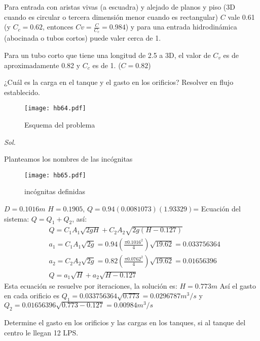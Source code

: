     Para entrada con aristas vivas (a escuadra) y alejado de planos y piso (3D cuando es circular o tercera dimensión menor cuando es rectangular) $C$ vale 0.61 (y $C_c=0.62$, entonces $Cv=\frac{C}{C_c}=0.984$) y para una entrada hidrodinámica (abocinada o tubos cortos) puede valer cerca de 1.
    
    Para un tubo corto que tiene una longitud de 2.5 a 3D, el valor de $C_v$ es de aproximadamente 0.82 y $C_c$ es de 1. ($C=0.82$)
    
    \begin{problem}
        ¿Cuál es la carga en el tanque y el gasto en los orificios? Resolver en flujo establecido.
    \end{problem}
    \begin{figure}[h!]
    \centering
      \texttt{[image: hb64.pdf]}
      \caption{Esquema del problema}
      \label{hb64}
    \end{figure}
    
    \textit{ Sol. }
    
    Planteamos los nombres de las incógnitas
    
    \begin{figure}[h!]
    \centering
      \texttt{[image: hb65.pdf]}
      \caption{incógnitas definidas}
      \label{65}
    \end{figure}
    $D=0.1016m$ $H=0.1905$, $Q=0.94(0.0081073)(1.93329)$=
    Ecuación del sistema: $Q=Q_1+Q_2$, así:
    \begin{align*}
        &Q = C_1A_1 \sqrt{2gH} + C_2A_2 \sqrt{2g(H - 0.127)}\\
        &a_1 = C_1A_1 \sqrt{2g} =0.94 \left(\frac{\pi 0.1016^2}{4}\right) \sqrt{19.62} = 0.033756364\\
        &a_2 = C_2A_2 \sqrt{2g} =0.82 \left(\frac{\pi 0.0762^2}{4}\right) \sqrt{19.62} = 0.01656396\\
        &Q = a_1 \sqrt{H} + a_2 \sqrt{H - 0.127}
    \end{align*}
    Esta ecuación se resuelve por iteraciones, la solución es: $H=0.773m$ Así el gasto en cada orificio es $Q_1=0.033756364 \sqrt{0.773}=0.0296787 m^3/s$ y $Q_2=0.01656396 \sqrt{0.773-0.127}=0.00984 m^3/s$
    

    \begin{example}
        Determine el gasto en los orificios y las cargas en los tanques, si al tanque del centro le llegan 12 LPS.
    \end{example}
    
